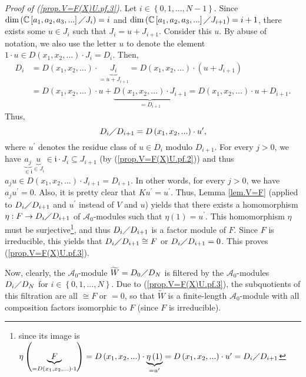 \documentclass[etingof-lie.tex]{subfiles}
\begin{document}
\textit{Proof of (\ref{prop.V=F(X)U.pf.3}).} Let $i\in\left\{
0,1,...,N-1\right\}  $. Since $\dim\left(  \mathbb{C}\left[  a_{1},a_{2}%
,a_{3},...\right]  \diagup J_{i}\right)  =i$ and $\dim\left(  \mathbb{C}%
\left[  a_{1},a_{2},a_{3},...\right]  \diagup J_{i+1}\right)  =i+1$, there
exists some $u\in J_{i}$ such that $J_{i}=u+J_{i+1}$. Consider this $u$. By
abuse of notation, we also use the letter $u$ to denote the element $1\cdot
u\in D\left(  x_{1},x_{2},...\right)  \cdot J_{i}=D_{i}$. Then,
\begin{align*}
D_{i}  &  =D\left(  x_{1},x_{2},...\right)  \cdot\underbrace{J_{i}%
}_{=u+J_{i+1}}=D\left(  x_{1},x_{2},...\right)  \cdot\left(  u+J_{i+1}\right)
\\
&  =D\left(  x_{1},x_{2},...\right)  \cdot u+\underbrace{D\left(  x_{1}%
,x_{2},...\right)  \cdot J_{i+1}}_{=D_{i+1}}=D\left(  x_{1},x_{2},...\right)
\cdot u+D_{i+1}.
\end{align*}
Thus,
\[
D_{i}\diagup D_{i+1}=D\left(  x_{1},x_{2},...\right)  \cdot u^{\prime},
\]
where $u^{\prime}$ denotes the residue class of $u\in D_{i}$ modulo $D_{i+1}$.
For every $j>0$, we have $\underbrace{a_{j}}_{\in\mathfrak{i}}\underbrace{u}%
_{\in J_{i}}\in\mathfrak{i}\cdot J_{i}\subseteq J_{i+1}$ (by
(\ref{prop.V=F(X)U.pf.2})) and thus $a_{j}u\in D\left(  x_{1},x_{2}%
,...\right)  \cdot J_{i+1}=D_{i+1}$. In other words, for every $j>0$, we have
$a_{j}u^{\prime}=0$. Also, it is pretty clear that $Ku^{\prime}=u^{\prime}$.
Thus, Lemma \ref{lem.V=F} (applied to $D_{i}\diagup D_{i+1}$ and $u^{\prime}$
instead of $V$ and $u$) yields that there exists a homomorphism $\eta
:F\rightarrow D_{i}\diagup D_{i+1}$ of $\mathcal{A}_{0}$-modules such that
$\eta\left(  1\right)  =u^{\prime}$. This homomorphism $\eta$ must be
surjective\footnote{since its image is $\eta\left(  \underbrace{F}_{=D\left(
x_{1},x_{2},...\right)  \cdot1}\right)  =D\left(  x_{1},x_{2},...\right)
\cdot\underbrace{\eta\left(  1\right)  }_{=u^{\prime}}=D\left(  x_{1}%
,x_{2},...\right)  \cdot u^{\prime}=D_{i}\diagup D_{i+1}$}, and thus
$D_{i}\diagup D_{i+1}$ is a factor module of $F$. Since $F$ is irreducible,
this yields that $D_{i}\diagup D_{i+1}\cong F$ or $D_{i}\diagup D_{i+1}=0$.
This proves (\ref{prop.V=F(X)U.pf.3}).

Now, clearly, the $\mathcal{A}_{0}$-module $\widetilde{W}=D_{0}\diagup D_{N}$
is filtered by the $\mathcal{A}_{0}$-modules $D_{i}\diagup D_{N}$ for
$i\in\left\{  0,1,...,N\right\}  $. Due to (\ref{prop.V=F(X)U.pf.3}), the
subquotients of this filtration are all $\cong F$ or $=0$, so that
$\widetilde{W}$ is a finite-length $\mathcal{A}_{0}$-module with all
composition factors isomorphic to $F$ (since $F$ is irreducible).
\end{document}
